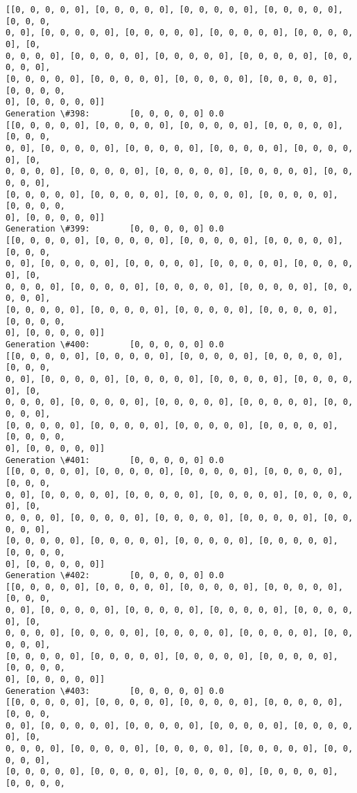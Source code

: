\documentclass[11pt]{article}
\begin{document}
\begin{Verbatim}[commandchars=\\\{\}]
[[0, 0, 0, 0, 0], [0, 0, 0, 0, 0], [0, 0, 0, 0, 0], [0, 0, 0, 0, 0], [0, 0, 0,
0, 0], [0, 0, 0, 0, 0], [0, 0, 0, 0, 0], [0, 0, 0, 0, 0], [0, 0, 0, 0, 0], [0,
0, 0, 0, 0], [0, 0, 0, 0, 0], [0, 0, 0, 0, 0], [0, 0, 0, 0, 0], [0, 0, 0, 0, 0],
[0, 0, 0, 0, 0], [0, 0, 0, 0, 0], [0, 0, 0, 0, 0], [0, 0, 0, 0, 0], [0, 0, 0, 0,
0], [0, 0, 0, 0, 0]]
Generation \#398:        [0, 0, 0, 0, 0] 0.0
[[0, 0, 0, 0, 0], [0, 0, 0, 0, 0], [0, 0, 0, 0, 0], [0, 0, 0, 0, 0], [0, 0, 0,
0, 0], [0, 0, 0, 0, 0], [0, 0, 0, 0, 0], [0, 0, 0, 0, 0], [0, 0, 0, 0, 0], [0,
0, 0, 0, 0], [0, 0, 0, 0, 0], [0, 0, 0, 0, 0], [0, 0, 0, 0, 0], [0, 0, 0, 0, 0],
[0, 0, 0, 0, 0], [0, 0, 0, 0, 0], [0, 0, 0, 0, 0], [0, 0, 0, 0, 0], [0, 0, 0, 0,
0], [0, 0, 0, 0, 0]]
Generation \#399:        [0, 0, 0, 0, 0] 0.0
[[0, 0, 0, 0, 0], [0, 0, 0, 0, 0], [0, 0, 0, 0, 0], [0, 0, 0, 0, 0], [0, 0, 0,
0, 0], [0, 0, 0, 0, 0], [0, 0, 0, 0, 0], [0, 0, 0, 0, 0], [0, 0, 0, 0, 0], [0,
0, 0, 0, 0], [0, 0, 0, 0, 0], [0, 0, 0, 0, 0], [0, 0, 0, 0, 0], [0, 0, 0, 0, 0],
[0, 0, 0, 0, 0], [0, 0, 0, 0, 0], [0, 0, 0, 0, 0], [0, 0, 0, 0, 0], [0, 0, 0, 0,
0], [0, 0, 0, 0, 0]]
Generation \#400:        [0, 0, 0, 0, 0] 0.0
[[0, 0, 0, 0, 0], [0, 0, 0, 0, 0], [0, 0, 0, 0, 0], [0, 0, 0, 0, 0], [0, 0, 0,
0, 0], [0, 0, 0, 0, 0], [0, 0, 0, 0, 0], [0, 0, 0, 0, 0], [0, 0, 0, 0, 0], [0,
0, 0, 0, 0], [0, 0, 0, 0, 0], [0, 0, 0, 0, 0], [0, 0, 0, 0, 0], [0, 0, 0, 0, 0],
[0, 0, 0, 0, 0], [0, 0, 0, 0, 0], [0, 0, 0, 0, 0], [0, 0, 0, 0, 0], [0, 0, 0, 0,
0], [0, 0, 0, 0, 0]]
Generation \#401:        [0, 0, 0, 0, 0] 0.0
[[0, 0, 0, 0, 0], [0, 0, 0, 0, 0], [0, 0, 0, 0, 0], [0, 0, 0, 0, 0], [0, 0, 0,
0, 0], [0, 0, 0, 0, 0], [0, 0, 0, 0, 0], [0, 0, 0, 0, 0], [0, 0, 0, 0, 0], [0,
0, 0, 0, 0], [0, 0, 0, 0, 0], [0, 0, 0, 0, 0], [0, 0, 0, 0, 0], [0, 0, 0, 0, 0],
[0, 0, 0, 0, 0], [0, 0, 0, 0, 0], [0, 0, 0, 0, 0], [0, 0, 0, 0, 0], [0, 0, 0, 0,
0], [0, 0, 0, 0, 0]]
Generation \#402:        [0, 0, 0, 0, 0] 0.0
[[0, 0, 0, 0, 0], [0, 0, 0, 0, 0], [0, 0, 0, 0, 0], [0, 0, 0, 0, 0], [0, 0, 0,
0, 0], [0, 0, 0, 0, 0], [0, 0, 0, 0, 0], [0, 0, 0, 0, 0], [0, 0, 0, 0, 0], [0,
0, 0, 0, 0], [0, 0, 0, 0, 0], [0, 0, 0, 0, 0], [0, 0, 0, 0, 0], [0, 0, 0, 0, 0],
[0, 0, 0, 0, 0], [0, 0, 0, 0, 0], [0, 0, 0, 0, 0], [0, 0, 0, 0, 0], [0, 0, 0, 0,
0], [0, 0, 0, 0, 0]]
Generation \#403:        [0, 0, 0, 0, 0] 0.0
[[0, 0, 0, 0, 0], [0, 0, 0, 0, 0], [0, 0, 0, 0, 0], [0, 0, 0, 0, 0], [0, 0, 0,
0, 0], [0, 0, 0, 0, 0], [0, 0, 0, 0, 0], [0, 0, 0, 0, 0], [0, 0, 0, 0, 0], [0,
0, 0, 0, 0], [0, 0, 0, 0, 0], [0, 0, 0, 0, 0], [0, 0, 0, 0, 0], [0, 0, 0, 0, 0],
[0, 0, 0, 0, 0], [0, 0, 0, 0, 0], [0, 0, 0, 0, 0], [0, 0, 0, 0, 0], [0, 0, 0, 0,

\end{Verbatim}
\end{document}
